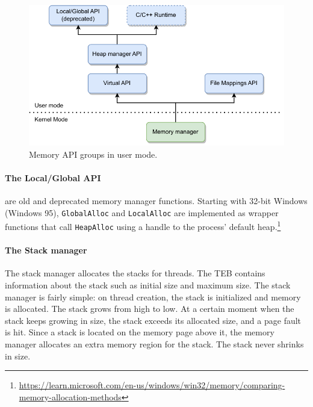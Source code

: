 \documentclass[a4paper, 11pt, english]{report}
\begin{document}
\begin{figure}[h]
\includegraphics{images/MemoryAPI-3.drawio.pdf}
	\caption{Memory API groups in user mode.}
	\label{fig:memory-api}
\end{figure}

\paragraph{The Local/Global API}
are old and deprecated memory manager functions. Starting with 32-bit Windows (Windows 95), \texttt{GlobalAlloc} and \texttt{LocalAlloc} are implemented as wrapper functions that call \texttt{HeapAlloc} using a handle to the process' default heap.\footnote{\url{https://learn.microsoft.com/en-us/windows/win32/memory/comparing-memory-allocation-methods}}

\paragraph{The Stack manager}
The stack manager allocates the stacks for threads. The TEB contains information about the stack such as initial size and maximum size. The stack manager is fairly simple: on thread creation, the stack is initialized and memory is allocated. The stack grows from high to low. At a certain moment when the stack keeps growing in size, the stack exceeds its allocated size, and a page fault is hit. Since a stack is located on the memory page above it, the memory manager allocates an extra memory region for the stack. The stack never shrinks in size.
\end{document}
